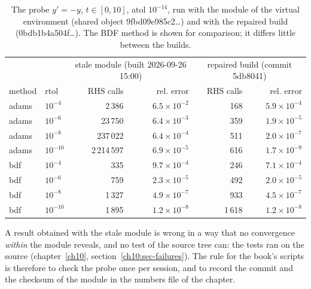 \begin{table}[h]\centering\small\setlength{\tabcolsep}{4pt}\begin{tabular}{@{}llrrrr@{}}\toprule & & \multicolumn{2}{c}{stale module (built 2026-09-26 15:00)} & \multicolumn{2}{c}{repaired build (commit 5db8041)}\\
method & rtol & RHS calls & rel. error & RHS calls & rel. error\\\midrule
adams & $10^{-4}$ & 2\,386 & $6.5\!\times\!10^{-2}$ & 168 & $5.9\!\times\!10^{-4}$ \\
adams & $10^{-6}$ & 23\,750 & $6.4\!\times\!10^{-3}$ & 359 & $1.9\!\times\!10^{-5}$ \\
adams & $10^{-8}$ & 237\,022 & $6.4\!\times\!10^{-4}$ & 511 & $2.0\!\times\!10^{-7}$ \\
adams & $10^{-10}$ & 2\,214\,597 & $6.9\!\times\!10^{-5}$ & 616 & $1.7\!\times\!10^{-9}$ \\
bdf & $10^{-4}$ & 335 & $9.7\!\times\!10^{-4}$ & 246 & $7.1\!\times\!10^{-4}$ \\
bdf & $10^{-6}$ & 759 & $2.3\!\times\!10^{-5}$ & 492 & $2.0\!\times\!10^{-5}$ \\
bdf & $10^{-8}$ & 1\,327 & $4.9\!\times\!10^{-7}$ & 933 & $4.5\!\times\!10^{-7}$ \\
bdf & $10^{-10}$ & 1\,895 & $1.2\!\times\!10^{-8}$ & 1\,618 & $1.2\!\times\!10^{-8}$ \\
\bottomrule\end{tabular}\caption{The probe $y'=-y$, $t\in[0,10]$, atol $10^{-14}$, run with the module of the virtual environment (shared object 9fbd09e985c2\ldots) and with the repaired build (0bdb1b4a504f\ldots). The BDF method is shown for comparison; it differs little between the builds.}\label{appB:tab-cvode}\end{table}
A result obtained with the stale module is wrong in a way that no convergence \emph{within} the module reveals, and no test of the source tree can: the tests ran on the source (chapter~\ref{ch10}, section~\ref{ch10:sec-failures}). The rule for the book's scripts is therefore to check the probe once per session, and to record the commit and the checksum of the module in the numbers file of the chapter.
